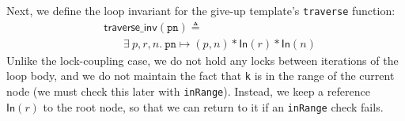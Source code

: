 \documentclass[sigplan,screen]{acmart}
\newcommand{\treerep}{\ensuremath{\mathsf{Abs}}}
\newcommand{\inFP}{\ensuremath{\mathsf{In }}}
\newcommand{\wm}[1]{\textbf{\textcolor{violet}{[William: #1]}}}
\begin{document}


Next, we define the loop invariant for the give-up template's \texttt{traverse} function:
\begin{align*} &\mathsf{traverse\_inv}(\texttt{pn}) \triangleq \\  & \ \ \ \ \ \ \ \ \exists \ p, r, n.\ \texttt{pn} \mapsto (p, n) \ast  \inFP (r) \ast \inFP (n)
\end{align*}
Unlike the lock-coupling case, we do not hold any locks between iterations of the loop body, and we do not maintain the fact that \lstinline{k} is in the range of the current node (we must check this later with \lstinline{inRange}). Instead, we keep a reference $\inFP(r)$ to the root node, so that we can return to it if an \lstinline{inRange} check fails.
\end{document}
